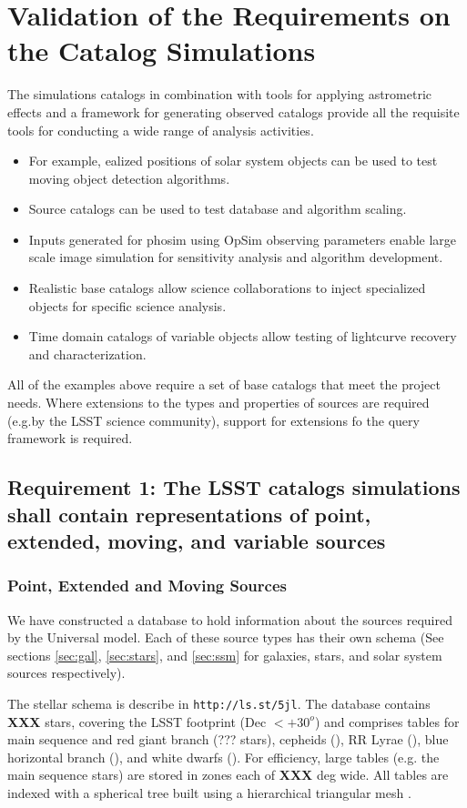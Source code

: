 \documentclass[]{article}
\begin{document}
{\section{Validation of the Requirements on the Catalog Simulations}
The simulations catalogs in combination with tools for applying astrometric effects and a 
framework for generating observed catalogs provide all the requisite tools for conducting a 
wide range of analysis activities.
\begin{itemize}
\item For example, ealized positions of solar system objects can be used to test moving object detection algorithms.
\item Source catalogs can be used to test database and algorithm scaling.
\item Inputs generated for phosim using OpSim observing parameters enable large scale image simulation
for sensitivity analysis and algorithm development.
\item Realistic base catalogs allow science collaborations to inject specialized objects for specific science
analysis.
\item Time domain catalogs of variable objects allow testing of lightcurve recovery and characterization.
\end{itemize}

All of the examples above require a set of base catalogs that meet the project needs.  Where extensions to the types and
properties of sources are required (e.g.by the LSST science community), support for extensions fo the query 
framework is required.  

\subsection{Requirement 1: The LSST catalogs simulations shall contain representations of point,
extended, moving, and variable sources}

\subsubsection{Point, Extended and Moving Sources}
We have constructed a database to hold information about the sources required by the Universal model.
Each of these source types has their own schema (See sections \ref{sec:gal}, \ref{sec:stars}, and \ref{sec:ssm} for galaxies, stars, and solar system sources respectively).

The stellar schema is describe in {\tt http://ls.st/5jl}.  The database contains {\bf XXX} stars, covering the LSST footprint (Dec $< +30^o$)
and comprises tables for main sequence and red giant branch (??? stars), cepheids (), RR Lyrae (), blue horizontal branch (), and white dwarfs ().
For efficiency, large tables (e.g. the main sequence stars) are stored in zones each of {\bf XXX} deg wide.  All tables are indexed with a spherical
tree built using a hierarchical triangular mesh \citep[HTM][]{htm}. 

}
\end{document}
